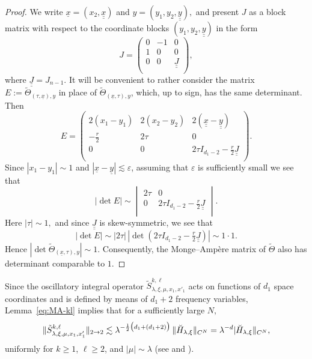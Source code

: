 \documentclass[leqno]{amsart}
\theoremstyle{definition}
\theoremstyle{remark}
\numberwithin{equation}{section}
\newcommand\la{{\lambda}}
\newcommand\ve{{\varepsilon}}
\begin{document}
\begin{proof}
We write $\underline x = (x_2,\underline{\underline x})$ and $y = (y_1,y_2,\underline{\underline y}),$
and present  $J$  as a block matrix with respect to the coordinate blocks $(y_1,y_2,\underline{\underline y})$ in the form 
\[
J=\begin{pmatrix}
0 &  -1& 0 \\
1 & 0 &0\\
0 & 0& \underline{\underline J} \\
\end{pmatrix},
\]
where $\underline{\underline J}=J_{n-1}.$ 
It will be convenient to rather consider the matrix $E:=\tilde\Theta_{(\tau,\underline x),y}$ in place of $\tilde\Theta_{(\underline x,\tau),y}$, which, up to sign, has the same determinant. 
Then
 \[
E = 
\begin{pmatrix}
2(x_1-y_1) & 2(x_2-y_2) & 2(\underline{\underline x}-\underline{\underline y})\\ 
-\tfrac r2 & 2\tau &0\\
0  & 0& 2\tau I_{d_1-2} - \tfrac r2\underline{\underline J} \\
\end{pmatrix}.
\]
Since $|x_1-y_1|\sim 1$ and $|\underline x-\underline y|\lesssim \ve$, assuming that $\ve$ is sufficiently small we see that
\[
|\det E|\sim \begin{vmatrix}
 2\tau &0\\
0& 2\tau I_{d_1-2} - \tfrac r2\underline{\underline J} \\
\end{vmatrix}.
\]
Here $|\tau|\sim 1,$ and since $\underline{\underline J}$ is skew-symmetric, we see that
\[
|\det E|
\sim |2\tau|\, |\det (2\tau I_{d_1-2} - \tfrac r2\underline{\underline J})|\sim 1\cdot 1.
\]
Hence $|\det \tilde\Theta_{(\underline x,\tau),y} |\sim 1$.
Consequently, the Monge--Ampère matrix of $\tilde\Theta$ also has determinant comparable to $1$.
\end{proof}

Since the oscillatory integral operator $\tilde S_{\lambda,\xi,\mu,x_1,x'_1}^{k,\ell}$ acts on functions of $d_1$ space coordinates and is defined by means of $d_1+2$ frequency variables, Lemma~\ref{eq:MA-kl} implies that for a sufficiently large $N,$ 
\[
 \|\tilde S_{\lambda,\xi,\mu,x_1,x'_1}^{k,\ell}\|_{2\to 2}\lesssim \la^{-\frac 12\big(d_1+(d_1+2)\big)}\, \|\breve H_{\la,\xi}\|_{C^N}=\la^{-d}\, \\|\breve H_{\la,\xi}\|_{C^N},
\] 
uniformly for $k\ge 1$, $\ell\ge 2$, and $|\mu|\sim\la$ (see \cite{Hoermander-Acta1971} and \cite{GreenleafSeeger-Escorial}). 
\end{document}
